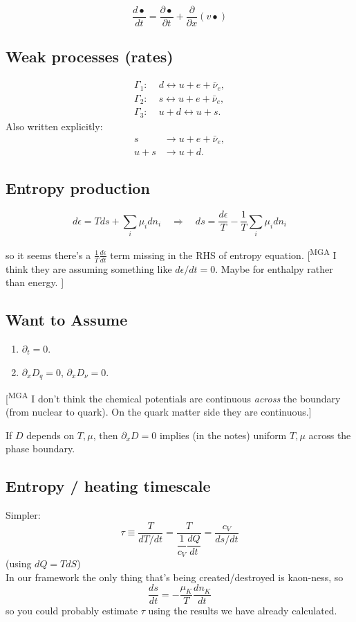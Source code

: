 \documentclass[11pt]{article}
\newcommand{\mga}[1]{{\color[rgb]{0.8,0,0}#1}}
\newcommand{\mgacom}[1]{\textsf{\color[rgb]{0.6,0,0}[\textsuperscript{MGA} #1]}}
\begin{document}
\begin{equation}
\boxed{
    \frac{d\bullet}{dt} = \frac{\partial \bullet}{\partial t} + \frac{\partial }{\partial x}(v\bullet)
}
\end{equation}

\subsection*{Weak processes (rates)}
\begin{align}
\Gamma_1:\;& d \leftrightarrow u + e + \bar{\nu}_e,
\\
\Gamma_2:\;& s \leftrightarrow u + e + \bar{\nu}_e,
\\
\Gamma_3:\;& u + d \leftrightarrow u + s.
\end{align}
Also written explicitly:
\begin{align}
s &\to u + e + \bar{\nu}_e,
\\
u+s &\to u+d.
\end{align}

\subsection*{Entropy production}

\begin{equation}
d\epsilon = Tds + \sum_i\mu_i dn_i \quad \Rightarrow \quad ds = \frac{d\epsilon}{T} - \frac{1}{T}\sum_i \mu_i dn_i
\end{equation}

so it seems there's a $\frac{1}{T}\frac{d\epsilon}{dt}$ term missing in the RHS of entropy equation. 
\mgacom{I think they are assuming something like $d\epsilon/dt=0$. Maybe for enthalpy rather than energy.  }
\subsection*{Want to Assume}
\begin{enumerate}
\item $\partial_t = 0$.
\item $\partial_x D_q = 0$, \qquad $\partial_x D_\nu = 0$.
\end{enumerate}
\mgacom{I don't think the chemical potentials are continuous {\em across} the boundary (from nuclear to quark). On the quark matter side they are continuous.}

If $D$ depends on $T,\mu$, then $\partial_x D=0$ implies (in the notes) uniform $T,\mu$ across the phase boundary.

\subsection*{Entropy / heating timescale}
\mga{Simpler:
\[
\tau \equiv \dfrac{T}{dT/dt} = \dfrac{T}{\dfrac{1}{c_V}\dfrac{dQ}{dt}} = \dfrac{c_V}{ds/dt}
\]
(using $dQ=TdS$)\\
In our framework the only thing that's being created/destroyed is kaon-ness, so
\[ \dfrac{ds}{dt} = -\dfrac{\mu_K}{T} \dfrac{dn_K}{dt}
\]
so you could probably estimate $\tau$ using the results we have already calculated. 
}
\end{document}
